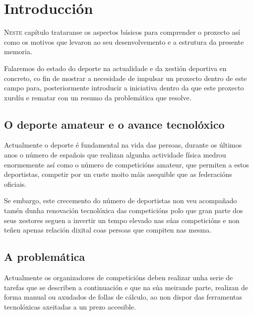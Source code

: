 \chapter{Introducción}
\minitoc


 \lettrine{N}{este} capítulo trataranse os aspectos básicos para comprender o proxecto 
así como os motivos que levaron ao seu desenvolvemento e a estrutura da presente 
memoria.

  Falaremos do estado do deporte na actualidade e da xestión deportiva en 
concreto, co fin de mostrar a necesidade de impulsar un proxecto dentro de este 
campo para, posteriormente introducir a iniciativa dentro da que este
proxecto xurdíu e rematar con un resumo da problemática que resolve.

 
  \section{O deporte amateur e o avance tecnolóxico}
    Actualmente o deporte é fundamental na vida das persoas, durante os últimos anos o 
número de españois que realizan algunha actividade física medrou enormemente así como o 
número de competicións amateur, que permiten a estos deportistas, competir por un custe 
moito máis asequible que as federacións oficiais.

    Se embargo, este crecemento do número de deportistas non veu acompañado tamén dunha 
renovación tecnolóxica das competicións polo que gran parte dos seus xestores seguen
a invertir un tempo elevado nas súas competicións e non teñen apenas 
relación dixital coas persoas que compiten nas mesma.

    \section{A problemática}
    Actualmente os organizadores de competicións deben realizar unha serie de tarefas que 
se describen a continuación e que na súa meirande parte, realizan de forma manual ou 
axudados de follas de cálculo, ao non dispor das ferramentas tecnolóxicas axeitadas a un 
prezo accesible.

